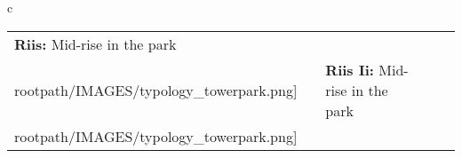 \begin{table}[H]
        \begin{tabular}{c}
        \begin{tabular}{m{1.25in} m{2in} m{.1in} m{1.25in} m{2in}}
\textbf{Riis:} {Mid-rise in the park} & \texttt{[image: \\rootpath/IMAGES/typology\_towerpark.png]} & & \textbf{Riis Ii:} {Mid-rise in the park} & \texttt{[image: \\rootpath/IMAGES/typology\_towerpark.png]}
\end{tabular}\end{tabular}
        \end{table}